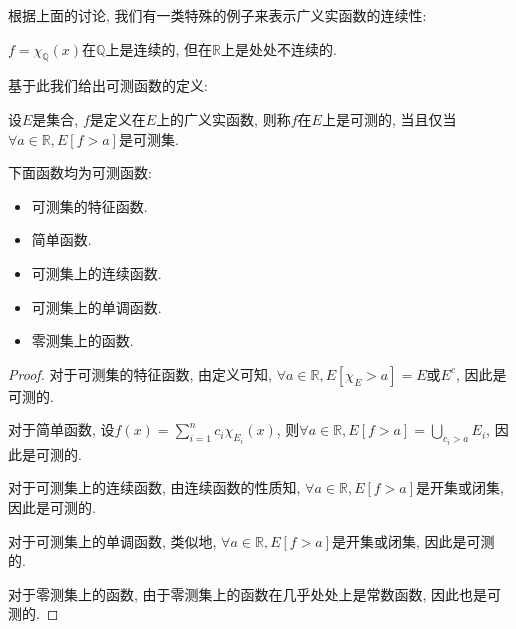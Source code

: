 \documentclass[theorem=false,mathfont=none,openany,sub3section]{easybook}
\begin{document}
根据上面的讨论, 我们有一类特殊的例子来表示广义实函数的连续性:\par

\begin{example}
  $f=\chi_{\mathbb{Q}}(x)$在$\mathbb{Q}$上是连续的, 但在$\mathbb{R}$上是处处不连续的.\par
\end{example}

基于此我们给出可测函数的定义:\par

\begin{definition}
  设$E$是集合, $f$是定义在$E$上的广义实函数, 则称$f$在$E$上是可测的, 当且仅当$\forall a\in \mathbb{R}, E[f> a]$是可测集.\par
\end{definition}

\begin{theorem}
  下面函数均为可测函数:\par
  \begin{itemize}
    \item 可测集的特征函数.\par
    \item 简单函数.\par
    \item 可测集上的连续函数.\par
    \item 可测集上的单调函数.\par
    \item 零测集上的函数.\par
  \end{itemize}
\end{theorem}

\begin{proof}
  对于可测集的特征函数, 由定义可知, $\forall a\in \mathbb{R}, E[\chi_E > a] = E$或$E^c$, 因此是可测的.\par
  对于简单函数, 设$f(x)=\sum_{i=1}^{n}c_i\chi_{E_i}(x)$, 则$\forall a\in \mathbb{R}, E[f>a]=\bigcup_{c_i>a}E_i$, 因此是可测的.\par
  对于可测集上的连续函数, 由连续函数的性质知, $\forall a\in \mathbb{R}, E[f>a]$是开集或闭集, 因此是可测的.\par
  对于可测集上的单调函数, 类似地, $\forall a\in \mathbb{R}, E[f>a]$是开集或闭集, 因此是可测的.\par
  对于零测集上的函数, 由于零测集上的函数在几乎处处上是常数函数, 因此也是可测的.\par
\end{proof}
\end{document}
